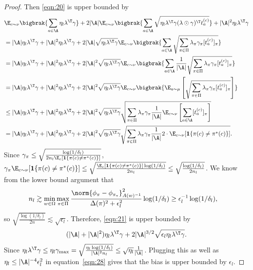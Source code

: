 \documentclass{article}
\newcommand{\1}{\mathbf{1}}
\begin{document}
\begin{proof}
Then \eqref{eqn:20} is upper bounded by
\begin{align}
    &\E_{c\sim\nu}\bigbrak{\sum_{a\in\A}\eta_l\lambda^\T\gamma}+2|\A|\E_{c\sim\nu}\bigbrak{\sum_{a\in\A}\sqrt{\eta_l\lambda^\T\gamma(\lambda\odot\gamma)^\T t_{a}^{(c)}}}+|\A|^2\eta_l\lambda^\T\gamma\nonumber\\
    &=|\A|\eta_l\lambda^\T\gamma+|\A|^2\eta_l\lambda^\T\gamma+2|\A|\sqrt{\eta_l\lambda^\T\gamma}\E_{c\sim\nu}\bigbrak{\sum_{a\in\A}\sqrt{\sum_{\pi\in\Pi}\lambda_\pi\gamma_\pi [t_{a}^{(c)}]_\pi}}\nonumber\\
    &=|\A|\eta_l\lambda^\T\gamma+|\A|^2\eta_l\lambda^\T\gamma+2|\A|^2\sqrt{\eta_l\lambda^\T\gamma}\E_{c\sim\nu}\bigbrak{\sum_{a\in\A}\frac{1}{|\A|}\sqrt{\sum_{\pi\in\Pi}\lambda_\pi\gamma_\pi [t_{a}^{(c)}]_\pi}}\nonumber\\
    &=|\A|\eta_l\lambda^\T\gamma+|\A|^2\eta_l\lambda^\T\gamma+2|\A|^2\sqrt{\eta_l\lambda^\T\gamma}\E_{c\sim\nu}\bigbrak{\E_{a\sim\mu}\left[\sqrt{\sum_{\pi\in\Pi}\lambda_\pi\gamma_\pi [t_{a}^{(c)}]_\pi}\right]}\nonumber\\
    &\leq |\A|\eta_l\lambda^\T\gamma+|\A|^2\eta_l\lambda^\T\gamma+2|\A|^2\sqrt{\eta_l\lambda^\T\gamma}\sqrt{\sum_{\pi\in\Pi}\lambda_\pi\gamma_\pi\frac{1}{|\A|}\E_{c\sim\nu}\left[\sum_{a\in\A}[t_{a}^{(c)}]_\pi\right]}\nonumber\\
    &= |\A|\eta_l\lambda^\T\gamma+|\A|^2\eta_l\lambda^\T\gamma+2|\A|^2\sqrt{\eta_l\lambda^\T\gamma}\sqrt{\sum_{\pi\in\Pi}\lambda_\pi\gamma_\pi\frac{1}{|\A|}2\cdot\E_{c\sim\nu}[\1\{\pi(c)\ne\pi^*(c)\}]}.\label{eqn:21}
\end{align}
Since $\gamma_\pi\leq \sqrt{\frac{\log(1/\delta_l)}{2n_l\E_c[\1\{\pi(c)\ne\pi^*(c)\}]}}$, $\gamma_\pi\E_{c\sim\nu}[\1\{\pi(c)\ne\pi^*(c)\}]\leq \sqrt{\frac{\E_c[\1\{\pi(c)\ne\pi^*(c)\}]\log(1/\delta_l)}{2n_l}}\leq \sqrt{\frac{\log(1/\delta_l)}{2n_l}}$. We know from the lower bound argument that 
\begin{align*}
    n_l&\gtrsim \min_{w\in\Omega}\max_{\pi\in\Pi}\frac{\norm{\phi_\pi-\phi_{\pi_*}}_{A(w)^{-1}}^2}{\Delta(\pi)^2+\epsilon_l^2}\log(1/\delta_l)\geq\epsilon_l^{-1}\log(1/\delta_l),
\end{align*}
so $\sqrt{\frac{\log(1/\delta_l)}{2n}}\lesssim \sqrt{\epsilon_l}$. Therefore, \eqref{eqn:21} is upper bounded by 
\begin{align}
    (|\A|+|\A|^2)\eta_l\lambda^\T\gamma+2|\A|^{3/2}\sqrt{\epsilon_l\eta_l\lambda^\T\gamma}.\label{eqn:28}
\end{align}
Since $\eta_l\lambda^\T\gamma\leq \eta_l\gamma_{\max}=\sqrt{\frac{\eta_l\log(1/\delta_l)}{|\A|^2 n_l}}\leq \sqrt{\eta_l}\frac{1}{|\A|}$. Plugging this as well as $\eta_l\leq |\A|^{-4}\epsilon_l^2$ in equation~\ref{eqn:28} gives that the bias is upper bounded by $\epsilon_l$. 

\end{proof}
\end{document}
